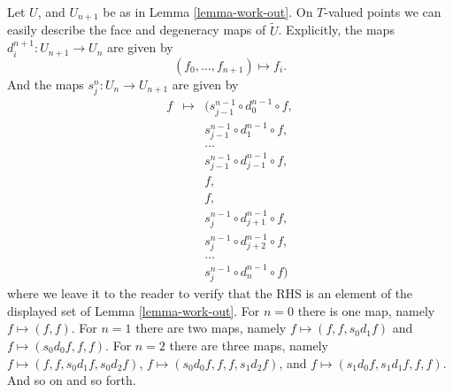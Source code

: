 \begin{remark}
\label{remark-explicit-face-degeneracy}
Let $U$, and $U_{n + 1}$ be as in Lemma \ref{lemma-work-out}.
On $T$-valued points we can easily describe the face
and degeneracy maps of $\tilde U$.
Explicitly, the maps $d^{n + 1}_i : U_{n + 1} \to U_n$
are given by
$$
(f_0, \ldots, f_{n + 1}) \longmapsto f_i.
$$
And the maps $s^n_j : U_n \to U_{n + 1}$ are given by
\begin{eqnarray*}
f & \longmapsto & (
s^{n - 1}_{j - 1} \circ d^{n - 1}_0 \circ f, \\
& &
s^{n - 1}_{j - 1} \circ d^{n - 1}_1 \circ f, \\
& &
\ldots\\
& &
s^{n - 1}_{j - 1} \circ d^{n - 1}_{j - 1} \circ f, \\
& &
f, \\
& &
f, \\
& &
s^{n - 1}_j \circ d^{n - 1}_{j + 1} \circ f, \\
& &
s^{n - 1}_j \circ d^{n - 1}_{j + 2} \circ f, \\
& &
\ldots\\
& &
s^{n - 1}_j \circ d^{n - 1}_n \circ f
)
\end{eqnarray*}
where we leave it to the reader to verify that the RHS
is an element of the displayed set of Lemma \ref{lemma-work-out}.
For $n = 0$ there is one map, namely $f \mapsto (f, f)$.
For $n = 1$ there are two maps, namely
$f \mapsto (f, f, s_0d_1f)$ and
$f \mapsto (s_0d_0f, f, f)$.
For $n = 2$ there are three maps, namely
$f \mapsto (f, f, s_0d_1f, s_0d_2f)$,
$f \mapsto (s_0d_0f, f, f, s_1d_2f)$, and
$f \mapsto (s_1d_0f, s_1d_1f, f, f)$.
And so on and so forth.
\end{remark}

